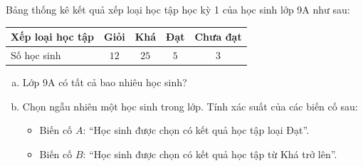 \begin{bt}%
Bảng thống kê kết quả xếp loại học tập học kỳ 1 của học sinh lớp 9A như sau:
\begin{center}
\begin{tabular}{|l|c|c|c|c|}
\hline
Xếp loại học tập & Giỏi & Khá & Đạt & Chưa đạt \\ \hline
Số học sinh & $12$ & $25$ & $5$ & $3$ \\ \hline
\end{tabular}
\end{center}
\begin{enumerate}[a)]
	\item Lớp 9A có tất cả bao nhiêu học sinh?
	\item Chọn ngẫu nhiên một học sinh trong lớp. Tính xác suất của các biến cố sau:
	\begin{itemize}
		\item Biến cố $A$: ``Học sinh được chọn có kết quả học tập loại Đạt''.
		\item Biến cố $B$: ``Học sinh được chọn có kết quả học tập từ Khá trở lên''.
	\end{itemize}
\end{enumerate}
\end{bt}

